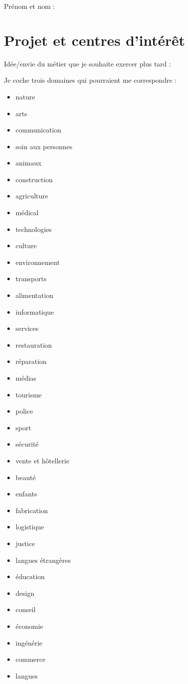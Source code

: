 \documentclass[11pt,a5paper]{article}
\newcommand{\checkbox}{\(\square\)}
\newcommand{\ligne}{{\color{gray!60}\hrulefill}}
\begin{document}
\newpage
Prénom et nom : \ligne

\section*{Projet et centres d'intérêt}

Idée/envie du métier que je souhaite exercer plus tard :

\ligne

\vspace{0.6em}
Je coche trois domaines qui pourraient me correspondre :

\begin{multicols}{3}
\begin{itemize}[label=\checkbox]
  \item nature
  \item arts
  \item communication
  \item soin aux personnes
  \item animaux
  \item construction
  \item agriculture
  \item médical
  \item technologies
  \item culture
  \item environnement
  \item transports
  \item alimentation
  \item informatique
  \item services
  \item restauration
  \item réparation
  \item médias
  \item tourisme
  \item police
  \item sport
  \item sécurité
  \item vente et hôtellerie
  \item beauté
  \item enfants
  \item fabrication
  \item logistique
  \item justice
  \item langues étrangères
  \item éducation
  \item design
  \item conseil
  \item économie
  \item ingénérie
  \item commerce
  \item langues
\end{itemize}

\end{multicols}
\end{document}
